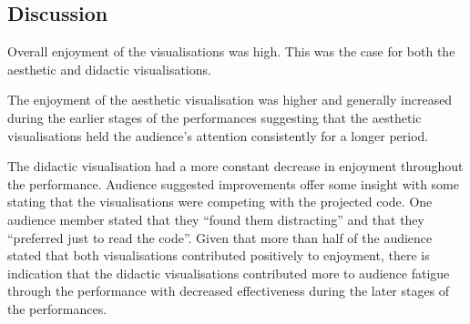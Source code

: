 \documentclass{sig-alternate}
\begin{document}





\subsection{Discussion}

Overall enjoyment of the visualisations was high. This was the case for both the aesthetic and didactic visualisations.

The enjoyment of the aesthetic visualisation was higher and generally increased during the earlier stages of the performances suggesting that the aesthetic visualisations held the audience's attention consistently for a longer period.

The didactic visualisation had a more constant decrease in enjoyment throughout the performance. Audience suggested improvements offer some insight with some stating that the visualisations were competing with the projected code. One audience member stated that they ``found them distracting'' and that they ``preferred just to read the code''. Given that more than half of the audience stated that both visualisations contributed positively to enjoyment, there is indication that the didactic visualisations contributed more to audience fatigue through the performance with decreased effectiveness during the later stages of the performances.
\end{document}
